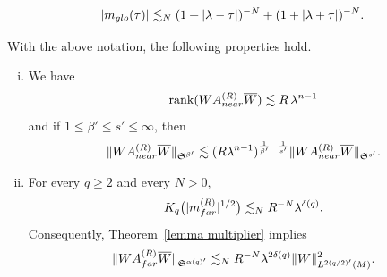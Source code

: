 \documentclass[10pt,a4paper]{amsart}
\begin{document}
  \begin{align}\label{eq:bound mglo}
    |m_{\rm glo}(\tau)|\lesssim_N (1+|\lambda-\tau|)^{-N}+(1+|\lambda+\tau|)^{-N}.
  \end{align}

\begin{lemma}\label{lem:near_far} With the above notation, the following properties hold.
     \begin{enumerate}[(i)]
    \item We have
          \begin{align}\label{eq:rank-Anear-R}
            \operatorname{rank} (WA_{\rm near}^{(R)}\overline{W})\lesssim R\,\lambda^{n-1}
          \end{align}
   and if \(1\leq \beta'\leq s'\leq \infty\), then
          \begin{align}\label{eq:rank-improvement-Anear-R}
            \|WA_{\rm near}^{(R)}\overline{W}\|_{\mathfrak{S}^{\beta'}}
            \lesssim
            (R\lambda^{n-1})^{\frac1{\beta'}-\frac1{s'}}
            \|WA_{\rm near}^{(R)}\overline{W}\|_{\mathfrak{S}^{s'}}.
          \end{align}       

    \item For every \(q\geq 2\) and every \(N>0\),
          \begin{align}\label{Kq-mfar-R}
            K_q\big(|m_{\rm far}^{(R)}|^{1/2}\big)
            \lesssim_N
            R^{-N}\lambda^{\delta(q)}.
          \end{align}
          Consequently, Theorem~\ref{lemma multiplier} implies
          \begin{align}\label{eq:Afar-negligible-R}
            \|WA_{\rm far}^{(R)}\overline{W}\|_{\mathfrak{S}^{\alpha(q)'}}
            \lesssim_N
            R^{-N}\lambda^{2\delta(q)}
            \|W\|_{L^{2(q/2)'}(M)}^2.
          \end{align}
  \end{enumerate}
\end{lemma}
\end{document}
